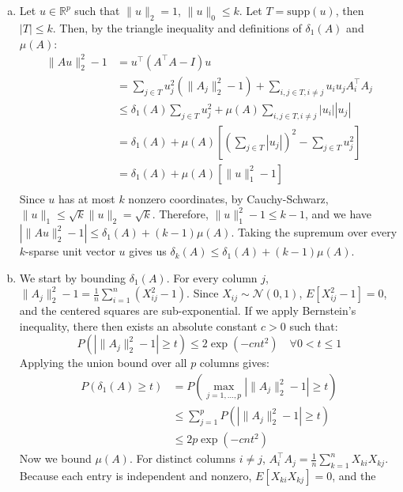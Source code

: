 \documentclass[11pt,a4paper,margin=1in]{article}
\begin{document}
\section{}
\begin{enumerate}[(a)]
    \item Let $u \in \mathbb{R}^p$ such that $\|u\|_2 = 1$, $\|u\|_0 \leq k$. 
    Let $T = \text{supp}(u)$, then $|T| \leq k$. Then, by the triangle
    inequality and definitions of $\delta_1(A)$ and $\mu(A)$:
    \begin{align*}
        \|Au\|_2^2 - 1 &= u^\top (A^\top A - I)u \\
        &= \sum_{j \in T} u_j^2(\|A_j\|_2^2 - 1) + \sum_{i,j \in T, i \neq j} u_iu_j A_i^\top A_j \\
        &\leq \delta_1(A)\sum_{j \in T} u_j^2 + \mu(A)\sum_{i,j \in T, i \neq j} |u_i||u_j| \\
        &= \delta_1(A) + \mu(A)\left[\left(\sum_{j \in T} |u_j|\right)^2 - \sum_{j \in T} u_j^2\right] \\
        &= \delta_1(A) + \mu(A)\left[\|u\|_1^2 - 1\right] \\
    \end{align*}
    Since $u$ has at most $k$ nonzero coordinates, by Cauchy-Schwarz, 
    $\|u\|_1 \leq \sqrt{k}\|u\|_2 = \sqrt{k}$. Therefore, $\|u\|_1^2 - 1 \leq k - 1$,
    and we have $|\|Au\|_2^2 - 1| \leq \delta_1(A) + (k - 1)\mu(A)$. Taking 
    the supremum over every $k$-sparse unit vector $u$ gives us
    $\delta_k(A) \leq \delta_1(A) + (k - 1)\mu(A)$.
    \item We start by bounding $\delta_1(A)$. For every column $j$, $\|A_j\|_2^2 - 1 = \frac{1}{n}\sum_{i=1}^n(X_{ij}^2 - 1)$. 
    Since $X_{ij} \sim \mathcal{N}(0,1)$, $E[X_{ij}^2 - 1] = 0$, and the centered
    squares are sub-exponential. If we apply Bernstein's inequality, there then
    exists an absolute constant $c > 0$ such that:
    \[
        P(|\|A_j\|_2^2 - 1| \geq t) \leq 2\exp(-cnt^2) \quad \forall 0 < t \leq 1
    \]
    Applying the union bound over all $p$ columns gives:
    \begin{align*}
        P(\delta_1(A) \geq t) &= P\left(\max_{j=1,\ldots,p}|\|A_j\|_2^2 - 1| \geq t\right) \\
        &\leq \sum_{j=1}^p P(|\|A_j\|_2^2 - 1| \geq t) \\
        &\leq 2p\exp(-cnt^2)
    \end{align*}
    Now we bound $\mu(A)$. For distinct columns $i \neq j$, $A_i^\top A_j = \frac{1}{n}\sum_{k=1}^n X_{ki}X_{kj}$.
    Because each entry is independent and nonzero, $E[X_{ki}X_{kj}] = 0$, and the 

\end{enumerate}
\end{document}
